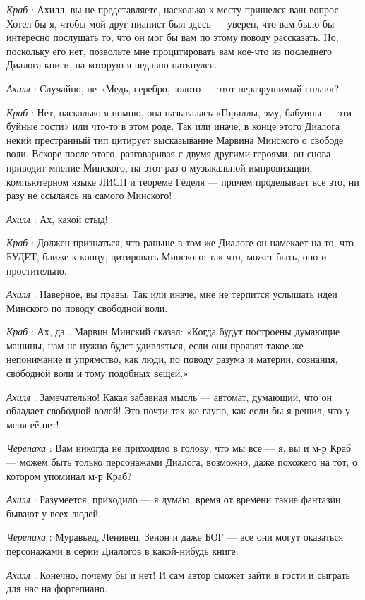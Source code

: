 \documentclass[../main.tex]{subfiles}
\begin{document}
\begin{dialogue}
\emph{Краб} : Ахилл, вы не представляете, насколько к месту пришелся ваш вопрос. Хотел бы я, чтобы мой друг пианист был здесь --- уверен, что вам было бы интересно послушать то, что он мог бы вам по этому поводу рассказать. Но, поскольку его нет, позвольте мне процитировать вам кое-что из последнего Диалога книги, на которую я недавно наткнулся.

\emph{Ахилл} : Случайно, не «Медь, серебро, золото --- этот неразрушимый сплав»?

\emph{Краб} : Нет, насколько я помню, она называлась «Гориллы, эму, бабуины --- эти буйные гости» или что-то в этом роде. Так или иначе, в конце этого Диалога некий престранный тип цитирует высказывание Марвина Минского о свободе воли. Вскоре после этого, разговаривая с двумя другими героями, он снова приводит мнение Минского, на этот раз о музыкальной импровизации, компьютерном языке ЛИСП и теореме Гёделя --- причем проделывает все это, ни разу не ссылаясь на самого Минского!

\emph{Ахилл} : Ах, какой стыд!

\emph{Краб} : Должен признаться, что раньше в том же Диалоге он намекает на то, что БУДЕТ, ближе к концу, цитировать Минского; так что, может быть, оно и простительно.

\emph{Ахилл} : Наверное, вы правы. Так или иначе, мне не терпится услышать идеи Минского по поводу свободной воли.

\emph{Краб} : Ах, да\ldots{} Марвин Минский сказал: «Когда будут построены думающие машины, нам не нужно будет удивляться, если они проявят такое же непонимание и упрямство, как люди, по поводу разума и материи, сознания, свободной воли и тому подобных вещей.»

\emph{Ахилл} : Замечательно! Какая забавная мысль --- автомат, думающий, что он обладает свободной волей! Это почти так же глупо, как если бы я решил, что у меня её нет!

\emph{Черепаха} : Вам никогда не приходило в голову, что мы все --- я, вы и м-р Краб --- можем быть только персонажами Диалога, возможно, даже похожего на тот, о котором упоминал м-р Краб?

\emph{Ахилл} : Разумеется, приходило --- я думаю, время от времени такие фантазии бывают у всех людей.

\emph{Черепаха} : Муравьед, Ленивец, Зенон и даже БОГ --- все они могут оказаться персонажами в серии Диалогов в какой-нибудь книге.

\emph{Ахилл} : Конечно, почему бы и нет! И сам автор сможет зайти в гости и сыграть для нас на фортепиано.


\end{dialogue}
\end{document}

